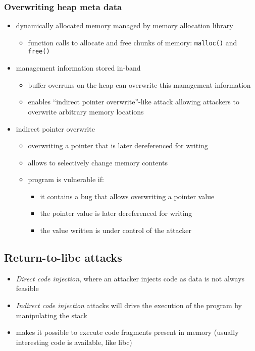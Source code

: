 \documentclass[12pt,titlepage,a4paper]{report}
\begin{document}
				\subsubsection{Overwriting heap meta data}
					\begin{itemize}
						\item dynamically allocated memory managed by memory allocation library
						\begin{itemize}
							\item function calls to allocate and free chunks of memory: \texttt{malloc()} and \texttt{free()}
						\end{itemize}
						\item management information stored in-band
						\begin{itemize}
							\item buffer overruns on the heap can overwrite this management information
							\item enables ``indirect pointer overwrite''-like attack allowing attackers to overwrite arbitrary memory locations
						\end{itemize}
					
						\item indirect pointer overwrite
						\begin{itemize}
							\item overwriting a pointer that is later dereferenced for writing
							\item allows to selectively change memory contents
							\item program is vulnerable if:
							\begin{itemize}
								\item it contains a bug that allows overwriting a pointer value
								\item the pointer value is later dereferenced for writing
								\item the value written is under control of the attacker
							\end{itemize}
						\end{itemize}
					\end{itemize}

			\subsection{Return-to-libc attacks}
				\begin{itemize}
					\item \emph{Direct code injection}, where an attacker injects code as data is not always feasible
					\item \emph{Indirect code injection} attacks will drive the execution of the program by manipulating the stack
					\item makes it possible to execute code fragments present in memory (usually interesting code is available, like libc)
				\end{itemize}
\end{document}
